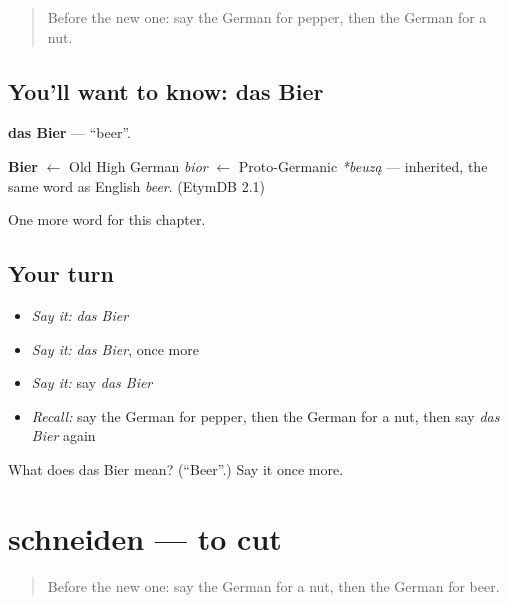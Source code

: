 \label{lesson:GE-C75-bier}



\begin{quote}
Before the new one: say the German for pepper, then the German for a nut.
\end{quote}

\subsection*{You'll want to know: das Bier}
\textbf{das Bier} — \textquotedblleft{}beer\textquotedblright{}.

\begin{cousinweb}
\textbf{Bier} $\leftarrow$ Old High German \emph{bior} $\leftarrow$ Proto-Germanic \emph{*beuzą} — inherited, the same word as English \emph{beer}. (EtymDB 2.1)
\end{cousinweb}

\begin{grammarlens}[title={What you've built}]
One more word for this chapter.
\end{grammarlens}

\subsection*{Your turn}
\begin{itemize}
\raggedright
  \item \emph{Say it:} \emph{das Bier}
  \item \emph{Say it:} \emph{das Bier}, once more
  \item \emph{Say it:} say \emph{das Bier}
  \item \emph{Recall:} say the German for pepper, then the German for a nut, then say \emph{das Bier} again
\end{itemize}

\begin{tcolorbox}[breakable,colback=teal!4,colframe=teal!35!black,title={Before you move on}]
What does das Bier mean? (\textquotedblleft{}Beer\textquotedblright{}.) Say it once more.
\end{tcolorbox}
\section[schneiden]{schneiden — to cut}

\label{lesson:GE-C75-schneiden}



\begin{quote}
Before the new one: say the German for a nut, then the German for beer.
\end{quote}

